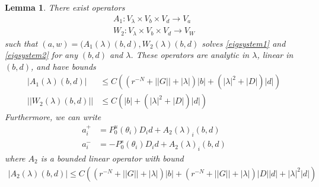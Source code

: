 \documentclass[12pt]{elsarticle}
\newtheorem{lemma}{Lemma}
\begin{document}
\begin{lemma}\label{eiginv2}
There exist operators 
\begin{align*}
A_1 : V_\lambda \times V_b \times V_d \rightarrow V_a \\
W_2 : V_\lambda \times V_b \times V_d \rightarrow V_W
\end{align*}
such that $(a, w) = (A_1(\lambda)(b,d), W_2(\lambda)(b,d)$ solves \eqref{eigsystem1} and \eqref{eigsystem2} for any $(b, d)$ and $\lambda$. These operators are analytic in $\lambda$, linear in $(b,d)$, and have bounds 
\begin{align}
|A_1(\lambda)(b, d)| &\leq C \left( (r^{-N} + ||G|| + |\lambda| ) |b| + (|\lambda|^2 + |D| ) |d| \right) \label{A1bound} \\
||W_2(\lambda)(b,d)|| &\leq C \left( |b| + (|\lambda|^2 + |D|) |d| \right) \label{W2bound}
\end{align}
Furthermore, we can write
\begin{align*}
a_i^+ &= P_0^u(\theta_i) D_i d + A_2(\lambda)_i(b,d) \\
a_i^- &= -P_0^s(\theta_i) D_i d + A_2(\lambda)_i(b,d)
\end{align*}
where $A_2$ is a bounded linear operator with bound
\begin{align}\label{A2bound}
|A_2(\lambda)(b,d)| \leq 
C\left( (r^{-N} + ||G|| + |\lambda| )|b| + (r^{-N} + ||G|| + |\lambda|)|D||d| + |\lambda|^2 |d|  \right)
\end{align}


\end{lemma}
\end{document}
